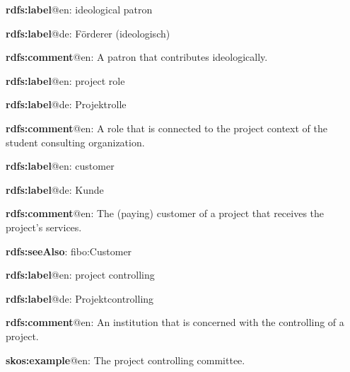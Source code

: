 \documentclass[a4paper, DIV=13, BCOR=0cm]{scrbook}
\begin{document}
\begin{mdframed}[style=onto-3, frametitle={Ideological\_Patron}]
	{%
		\begin{compactitem}
			\item \textbf{rdfs:label}@en: ideological patron
			\item \textbf{rdfs:label}@de: Förderer (ideologisch)
			\item \textbf{rdfs:comment}@en: A patron that contributes ideologically.
		\end{compactitem}
	} %
\end{mdframed}

\begin{mdframed}[style=onto-2, frametitle={Project\_Role}]
	{%
		\begin{compactitem}
			\item \textbf{rdfs:label}@en: project role
			\item \textbf{rdfs:label}@de: Projektrolle
			\item \textbf{rdfs:comment}@en: A role that is connected to the project context of the student consulting organization.
		\end{compactitem}
	} %
\end{mdframed}

\begin{mdframed}[style=onto-3, frametitle={Customer}]
	{%
		\begin{compactitem}
			\item \textbf{rdfs:label}@en: customer
			\item \textbf{rdfs:label}@de: Kunde
			\item \textbf{rdfs:comment}@en: The (paying) customer of a project that receives the project's services.
			\item \textbf{rdfs:seeAlso}: fibo:Customer
		\end{compactitem}
	} %
\end{mdframed}

\begin{mdframed}[style=onto-3, frametitle={Project\_Controlling}]
	{%
		\begin{compactitem}
			\item \textbf{rdfs:label}@en: project controlling
			\item \textbf{rdfs:label}@de: Projektcontrolling
			\item \textbf{rdfs:comment}@en: An institution that is concerned with the controlling of a project.
			\item \textbf{skos:example}@en: The project controlling committee.
		\end{compactitem}
	} %
\end{mdframed}
\end{document}
